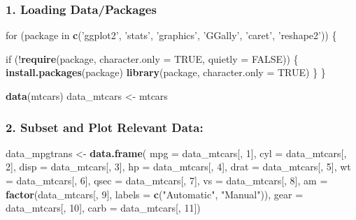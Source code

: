 \documentclass[]{article}
\newenvironment{Shaded}{\begin{snugshade}}{\end{snugshade}}
\newcommand{\KeywordTok}[1]{\textcolor[rgb]{0.13,0.29,0.53}{\textbf{{#1}}}}
\newcommand{\DataTypeTok}[1]{\textcolor[rgb]{0.13,0.29,0.53}{{#1}}}
\newcommand{\DecValTok}[1]{\textcolor[rgb]{0.00,0.00,0.81}{{#1}}}
\newcommand{\StringTok}[1]{\textcolor[rgb]{0.31,0.60,0.02}{{#1}}}
\newcommand{\OtherTok}[1]{\textcolor[rgb]{0.56,0.35,0.01}{{#1}}}
\newcommand{\NormalTok}[1]{{#1}}
\begin{document}
\subsubsection{1. Loading Data/Packages}\label{loading-datapackages}

\begin{Shaded}
\begin{Highlighting}[]
\NormalTok{for (package in }\KeywordTok{c}\NormalTok{(}\StringTok{'ggplot2'}\NormalTok{, }\StringTok{'stats'}\NormalTok{, }\StringTok{'graphics'}\NormalTok{, }\StringTok{'GGally'}\NormalTok{, }\StringTok{'caret'}\NormalTok{, }\StringTok{'reshape2'}\NormalTok{)) \{}
  
    \NormalTok{if (!}\KeywordTok{require}\NormalTok{(package, }\DataTypeTok{character.only =} \OtherTok{TRUE}\NormalTok{, }\DataTypeTok{quietly =} \OtherTok{FALSE}\NormalTok{)) \{}
        \KeywordTok{install.packages}\NormalTok{(package)}
        \KeywordTok{library}\NormalTok{(package, }\DataTypeTok{character.only =} \OtherTok{TRUE}\NormalTok{)}
    \NormalTok{\}}
\NormalTok{\}}

\KeywordTok{data}\NormalTok{(mtcars)}
\NormalTok{data_mtcars <-}\StringTok{ }\NormalTok{mtcars}
\end{Highlighting}
\end{Shaded}

\subsubsection{2. Subset and Plot Relevant
Data:}\label{subset-and-plot-relevant-data}

\begin{Shaded}
\begin{Highlighting}[]
\NormalTok{data_mpgtrans <-}\StringTok{ }\KeywordTok{data.frame}\NormalTok{(}
  \DataTypeTok{mpg =} \NormalTok{data_mtcars[, }\DecValTok{1}\NormalTok{],}
  \DataTypeTok{cyl =} \NormalTok{data_mtcars[, }\DecValTok{2}\NormalTok{],}
  \DataTypeTok{disp =} \NormalTok{data_mtcars[, }\DecValTok{3}\NormalTok{],}
  \DataTypeTok{hp =} \NormalTok{data_mtcars[, }\DecValTok{4}\NormalTok{],}
  \DataTypeTok{drat =} \NormalTok{data_mtcars[, }\DecValTok{5}\NormalTok{],}
  \DataTypeTok{wt =} \NormalTok{data_mtcars[, }\DecValTok{6}\NormalTok{],}
  \DataTypeTok{qsec =} \NormalTok{data_mtcars[, }\DecValTok{7}\NormalTok{],}
  \DataTypeTok{vs =} \NormalTok{data_mtcars[, }\DecValTok{8}\NormalTok{],}
  \DataTypeTok{am =} \KeywordTok{factor}\NormalTok{(data_mtcars[, }\DecValTok{9}\NormalTok{], }\DataTypeTok{labels =} \KeywordTok{c}\NormalTok{(}\StringTok{"Automatic"}\NormalTok{, }\StringTok{"Manual"}\NormalTok{)),}
  \DataTypeTok{gear =} \NormalTok{data_mtcars[, }\DecValTok{10}\NormalTok{],}
  \DataTypeTok{carb =} \NormalTok{data_mtcars[, }\DecValTok{11}\NormalTok{])}
\end{Highlighting}
\end{Shaded}
\end{document}
